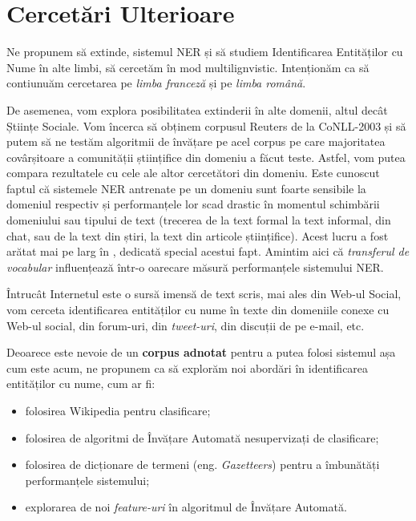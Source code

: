 \section{Cercetări Ulterioare}

Ne propunem să extinde, sistemul NER și să studiem Identificarea Entităților cu Nume în alte limbi, să cercetăm în mod multilignvistic. Intenționăm ca să contiunuăm cercetarea pe \textit{limba franceză} și pe \textit{limba română}.

De asemenea, vom explora posibilitatea extinderii în alte domenii, altul decât Științe Sociale. Vom încerca să obținem corpusul Reuters de la CoNLL-2003 și să putem să ne testăm algoritmii de învățare pe acel corpus pe care majoritatea covârșitoare a comunității științifice din domeniu a făcut teste. Astfel, vom putea compara rezultatele cu cele ale altor cercetători din domeniu. Este cunoscut faptul că sistemele NER antrenate pe un domeniu sunt foarte sensibile la domeniul respectiv și performanțele lor scad drastic în momentul schimbării domeniului sau tipului de text (trecerea de la text formal la text informal, din chat, sau de la text din știri, la text din articole științifice). Acest lucru a fost arătat mai pe larg în , dedicată special acestui fapt. Amintim aici că \textit{transferul de vocabular} influențează într-o oarecare măsură performanțele sistemului NER.

Întrucât Internetul este o sursă imensă de text scris, mai ales din Web-ul Social, vom cerceta identificarea entităților cu nume în texte din domeniile conexe cu Web-ul social, din forum-uri, din \textit{tweet-uri}, din discuții de pe e-mail, etc.

Deoarece este nevoie de un \textbf{corpus adnotat} pentru a putea folosi sistemul așa cum este acum, ne propunem ca să explorăm noi abordări în identificarea entităților cu nume, cum ar fi:

\begin{itemize}
\item folosirea Wikipedia pentru clasificare;
\item folosirea de algoritmi de Învățare Automată nesupervizați de clasificare;
\item folosirea de dicționare de termeni (eng. \textit{Gazetteers}) pentru a îmbunătăți performanțele sistemului;
\item explorarea de noi \textit{feature-uri} în algoritmul de Învățare Automată.
\end{itemize}

